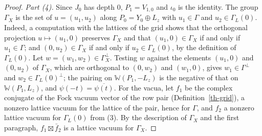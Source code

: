 \begin{proof}
\emph{Part (4).} Since $J_0$ has depth $0$, $P_1=V_{1,0}$ and $\iota_0$ is the
identity. The group $\Gamma_X$ is the set of $u=(u_1,u_2)$ along
$P_0=Y_0\oplus L_z$ with $u_1\in\Gamma$ and $u_2\in\Gamma_L(0)$. Indeed, a
computation with the lattices of the grid shows that the orthogonal projection
$u\mapsto(u_1,0)$ preserves $\Gamma_X$ and that $(u_1,0)\in\Gamma_X$ if and
only if $u_1\in\Gamma$; and $(0,u_2)\in\Gamma_X$ if and only if
$u_2\in\Gamma_L(0)$, by the definition of $\Gamma_L(0)$. Let
$w=(w_1,w_2)\in\Gamma_X^\perp$. Testing $w$ against the elements $(u_1,0)$
and $(0,u_2)$ of $\Gamma_X$, which are orthogonal to $(0,w_2)$ and $(w_1,0)$,
gives $w_1\in\Gamma^\perp$ and $w_2\in\Gamma_L(0)^\perp$; the pairing on
$\mathbb W(P_1,-L_z)$ is the negative of that on $\mathbb W(P_1,L_z)$, and
$\psi(-t)=\overline{\psi(t)}$. For the vacua, let $f_1$ be the complex conjugate
of the Fock vacuum vector of the row pair (Definition~\ref{th-grid}), a nonzero
lattice vacuum for the lattice of the pair, hence for $\Gamma$, and $f_2$ a
nonzero lattice vacuum for $\Gamma_L(0)$ from (3). By the description of
$\Gamma_X$ and the first paragraph, $f_1\boxtimes\bar f_2$ is a lattice vacuum
for $\Gamma_X$.
\end{proof}

